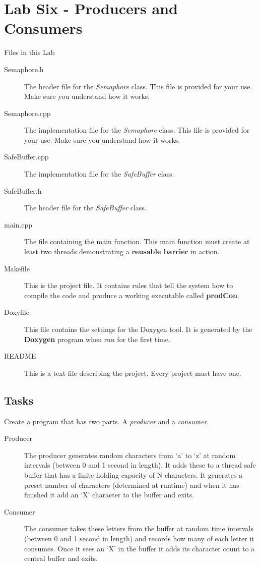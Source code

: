 \documentclass[10pt,a4paper]{article}
\begin{document}
 \section{Lab Six - Producers and Consumers}
 Files in this Lab
 \begin{description}
\item[Semaphore.h] The header file for the \textit{Semaphore} class.  This file is provided for your use.  Make sure you understand how it works.
\item[Semaphore.cpp] The implementation file for the \textit{Semaphore} class.  This file is provided for your use.  Make sure you understand how it works.
    \item[SafeBuffer.cpp] The implementation file for the \textit{SafeBuffer} class.  
    \item[SafeBuffer.h] The header file for the \textit{SafeBuffer} class.
\item[main.cpp] The file containing the main function.  This main function must create at least two threads demonstrating a \textbf{reusable barrier} in action.  
\item[Makefile] This is the project file. It contains rules that tell the system how to compile the code and produce a working executable called \textbf{prodCon}. 
\item[Doxyfile] This file contains the settings for the Doxygen tool. It is generated by the \textbf{Doxygen} program when run for the first time.
\item[README] This is a text file describing the project. Every project must have one.
\end{description}
 \subsection{Tasks}
 Create a program that has two parts.  A \textit{producer} and a \textit{consumer}.
\begin{description}
\item[Producer] The producer generates random characters from ‘a’ to ‘z’ at random intervals (between 0 and 1 second in length). It adds these to a thread safe buffer that has a finite holding capacity of N characters. It generates a preset number of characters (determined at runtime) and when it has finished it add an ‘X’ character to the buffer and exits.

\item[Consumer] The consumer takes these letters from the buffer at random time intervals (between 0 and 1 second in length) and records how many of each letter it consumes. Once it sees an ‘X’ in the buffer it adds its character count to a central buffer and exits.
\end{description}
\end{document}
